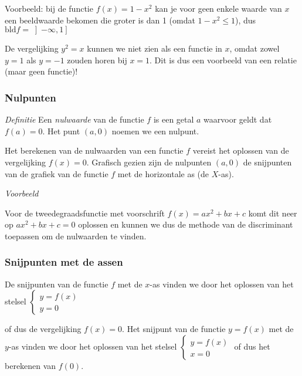 \noindent Voorbeeld: bij de functie $f(x)=1-x^{2}$ kan je voor geen
enkele waarde van $x$ een beeldwaarde bekomen die groter is dan 1 (omdat $1-x^2 \le 1$),
dus $\textrm{bld}f=\left]-\infty,1\right]$

\bigskip{}

De vergelijking $y^2=x$ kunnen we niet zien als een functie in $x$, omdat zowel $y=1$ als $y=-1$ zouden horen bij $x=1$. Dit is dus een voorbeeld van een relatie (maar geen functie)!

\subsubsection{Nulpunten}

\emph{Definitie}
Een \emph{nulwaarde} van de functie $f$ is een getal $a$ waarvoor geldt dat $f(a)=0$. Het punt $(a,0)$ noemen we een nulpunt.

\noindent Het berekenen van de nulwaarden van een
functie $f$ vereist het oplossen van de vergelijking $f(x)=0$.
Grafisch gezien zijn de nulpunten $(a,0)$ de snijpunten van de grafiek
van de functie $f$ met de horizontale as (de $X$-as).

\medskip{}

\emph{Voorbeeld}

\noindent Voor de tweedegraadsfunctie met voorschrift $f(x)=ax^2+bx+c$ komt dit neer op $ax^2+bx+c=0$ oplossen en kunnen we dus de methode van de discriminant toepassen om de nulwaarden te vinden.

\subsubsection{Snijpunten met de assen}

\noindent De snijpunten van de functie $f$ met de $x$-as vinden
we door het oplossen van het stelsel $\begin{cases}
y=f(x)\\
y=0
\end{cases}$

\medskip{}
 of dus de vergelijking $f(x)=0$. Het snijpunt van de functie $y=f(x)$ met de $y$-as vinden
we door het oplossen van het stelsel $\begin{cases}
y=f(x)\\
x=0
\end{cases}$ of dus het berekenen van $f(0)$.


%
%
%


